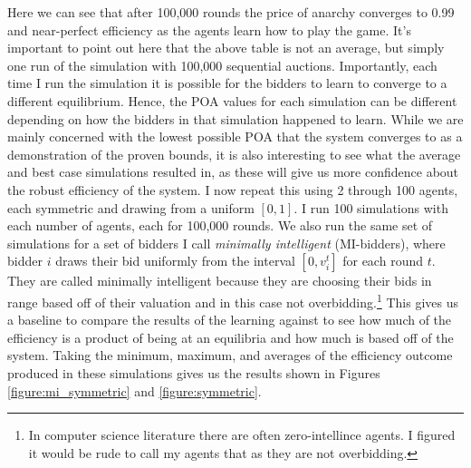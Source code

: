 \documentclass[12pt,twoside]{reedthesis}
\begin{document}
Here we can see that after 100,000 rounds the price of anarchy converges to 0.99 and near-perfect efficiency as the agents learn how to play the game. It's important to point out here that the above table is not an average, but simply one run of the simulation with 100,000 sequential auctions. Importantly, each time I run the simulation it is possible for the bidders to learn to converge to a different equilibrium. Hence, the POA values for each simulation can be different depending on how the bidders in that simulation happened to learn. While we are mainly concerned with the lowest possible POA that the system converges to as a demonstration of the proven bounds, it is also interesting to see what the average and best case simulations resulted in, as these will give us more confidence about the robust efficiency of the system. I now repeat this using 2 through 100 agents, each symmetric and drawing from a uniform $[0,1]$. I run 100 simulations with each number of agents, each for 100,000 rounds. We also run the same set of simulations for a set of bidders I call {\em minimally intelligent} (MI-bidders), where bidder $i$ draws their bid uniformly from the interval $[0,v_i^t]$ for each round $t$. They are called minimally intelligent because they are choosing their bids in range based off of their valuation and in this case not overbidding.\footnote{In computer science literature there are often zero-intellince agents. I figured it would be rude to call my agents that as they are not overbidding.} This gives us a baseline to compare the results of the learning against to see how much of the efficiency is a product of being at an equilibria and how much is based off of the system. Taking the minimum, maximum, and averages of the efficiency outcome produced in these simulations gives us the results shown in Figures \ref{figure:mi_symmetric} and \ref{figure:symmetric}. 
\end{document}
